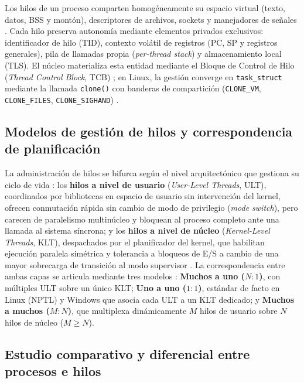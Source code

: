 \documentclass[12pt]{article}
\begin{document}
Los hilos de un proceso comparten homogéneamente su espacio virtual (texto, datos, BSS y montón), descriptores de archivos, sockets y manejadores de señales \parencite[\S 4.1, p.\ 112]{silberschatz2006fundamentos}. Cada hilo preserva autonomía mediante elementos privados exclusivos: identificador de hilo (TID), contexto volátil de registros (PC, SP y registros generales), pila de llamadas propia (\textit{per-thread stack}) y almacenamiento local (TLS). El núcleo materializa esta entidad mediante el Bloque de Control de Hilo (\textit{Thread Control Block}, TCB) \parencite[\S 3.6, p.\ 121]{carretero2001sistemas}; en Linux, la gestión converge en \texttt{task\_struct} mediante la llamada \texttt{clone()} con banderas de compartición (\texttt{CLONE\_VM}, \texttt{CLONE\_FILES}, \texttt{CLONE\_SIGHAND}) \parencite[\S 4.6, p.\ 208]{stallings2018operating}.

\subsection{Modelos de gestión de hilos y correspondencia de planificación}

La administración de hilos se bifurca según el nivel arquitectónico que gestiona su ciclo de vida \parencite[\S 4.2, p.\ 183]{stallings2018operating}: los \textbf{hilos a nivel de usuario} (\textit{User-Level Threads}, ULT), coordinados por bibliotecas en espacio de usuario sin intervención del kernel, ofrecen conmutación rápida sin cambio de modo de privilegio (\textit{mode switch}), pero carecen de paralelismo multinúcleo y bloquean al proceso completo ante una llamada al sistema síncrona; y los \textbf{hilos a nivel de núcleo} (\textit{Kernel-Level Threads}, KLT), despachados por el planificador del kernel, que habilitan ejecución paralela simétrica y tolerancia a bloqueos de E/S a cambio de una mayor sobrecarga de transición al modo supervisor \parencite[\S 4.2, p.\ 187]{stallings2018operating}. La correspondencia entre ambas capas se articula mediante tres modelos \parencite[\S 4.2, pp.\ 114--117]{silberschatz2006fundamentos}: \textbf{Muchos a uno ($N:1$)}, con múltiples ULT sobre un único KLT; \textbf{Uno a uno ($1:1$)}, estándar de facto en Linux (NPTL) y Windows que asocia cada ULT a un KLT dedicado; y \textbf{Muchos a muchos ($M:N$)}, que multiplexa dinámicamente $M$ hilos de usuario sobre $N$ hilos de núcleo ($M \ge N$).

\clearpage

\subsection{Estudio comparativo y diferencial entre procesos e hilos}
\end{document}

